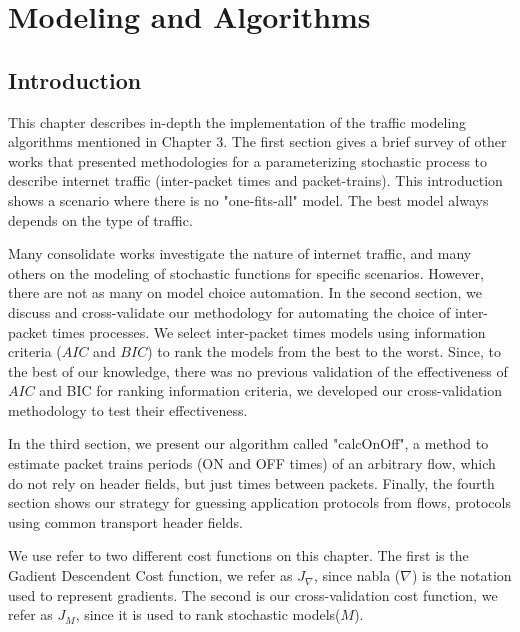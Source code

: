 \chapter{Modeling and Algorithms}\label{ch:modeling-evaluation}


\section{Introduction}


This chapter describes in-depth the implementation of the traffic modeling algorithms mentioned in Chapter 3. The first section gives a brief survey of other works that presented methodologies for a parameterizing stochastic process to describe internet traffic (inter-packet times and packet-trains). This introduction shows a scenario where there is no "one-fits-all" model. The best model always depends on the type of traffic. 

Many consolidate works investigate the nature of internet traffic, and many others on the modeling of stochastic functions for specific scenarios. However, there are not as many on model choice automation. In the second section, we discuss and cross-validate our methodology for automating the choice of inter-packet times processes. We select inter-packet times models using information criteria ($AIC$ and $BIC$) to rank the models from the best to the worst.  Since, to the best of our knowledge, there was no previous validation of the effectiveness of $AIC$ and BIC for ranking information criteria, we developed our cross-validation methodology to test their effectiveness.  

In the third section, we present our algorithm called "calcOnOff", a method to estimate packet trains periods (ON and OFF times) of an arbitrary flow, which do not rely on header fields, but just times between packets. Finally, the fourth section shows our strategy for guessing application protocols from flows, protocols using common transport header fields.


We use refer to two different cost functions on this chapter. The first is the Gadient Descendent Cost function, we refer as $J_\nabla$, since nabla ($\nabla$) is the notation used to represent gradients. The second is our cross-validation cost function, we refer as $J_M$, since it is used to rank stochastic models($M$).


